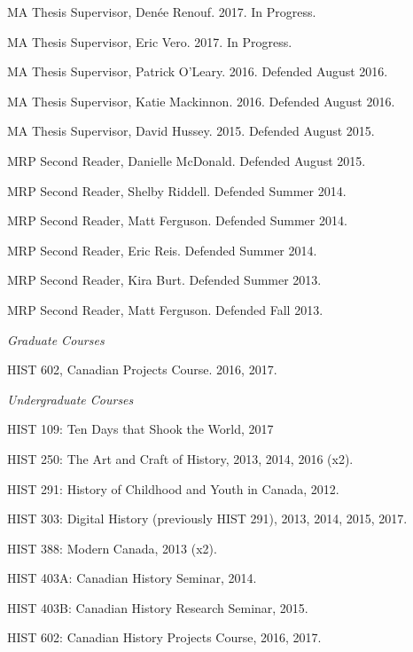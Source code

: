 \documentclass[11pt,article,oneside]{memoir}
\begin{document}
\ind MA Thesis Supervisor, Den\'ee Renouf. 2017. In Progress.

\ind MA Thesis Supervisor, Eric Vero. 2017. In Progress.

\ind MA Thesis Supervisor, Patrick O'Leary. 2016. Defended August 2016.

\ind MA Thesis Supervisor, Katie Mackinnon. 2016. Defended August 2016.

\ind MA Thesis Supervisor, David Hussey. 2015. Defended August 2015.

\ind MRP Second Reader, Danielle McDonald. Defended August 2015.

\ind MRP Second Reader, Shelby Riddell. Defended Summer 2014.

\ind MRP Second Reader, Matt Ferguson. Defended Summer 2014.

\ind MRP Second Reader, Eric Reis. Defended Summer 2014.

\ind MRP Second Reader, Kira Burt. Defended Summer 2013.

\ind MRP Second Reader, Matt Ferguson. Defended Fall 2013.

\medskip
\noindent\emph{Graduate Courses \vspace{0.05in}}

\ind HIST 602, Canadian Projects Course. 2016, 2017.

\medskip

\noindent\emph{Undergraduate Courses \vspace{0.05in}}

\ind HIST 109: Ten Days that Shook the World, 2017

\ind HIST 250: The Art and Craft of History, 2013, 2014, 2016 (x2).

\ind HIST 291: History of Childhood and Youth in Canada, 2012.

\ind HIST 303: Digital History (previously HIST 291), 2013, 2014, 2015, 2017.

\ind HIST 388: Modern Canada, 2013 (x2).

\ind HIST 403A: Canadian History Seminar, 2014.

\ind HIST 403B: Canadian History Research Seminar, 2015.

\ind HIST 602: Canadian History Projects Course, 2016, 2017.
\end{document}
